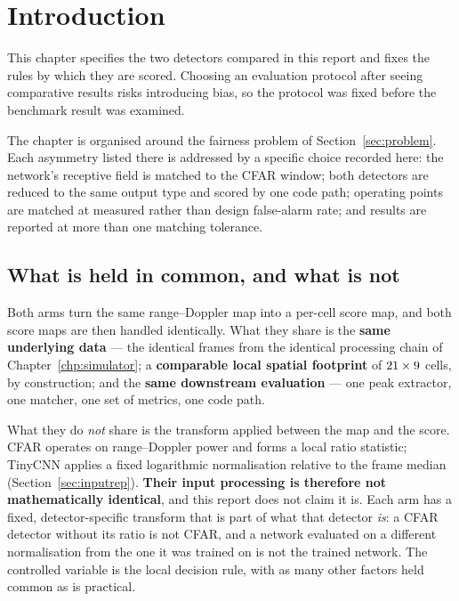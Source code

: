 
\section{Introduction}

This chapter specifies the two detectors compared in this report and fixes the rules by which they
are scored. Choosing an evaluation protocol after seeing comparative results risks introducing bias,
so the protocol was fixed before the benchmark result was examined.

The chapter is organised around the fairness problem of Section~\ref{sec:problem}. Each asymmetry
listed there is addressed by a specific choice recorded here: the network's receptive field is
matched to the CFAR window; both detectors are reduced to the same output type and scored by one
code path; operating points are matched at measured rather than design false-alarm rate; and results
are reported at more than one matching tolerance.

\subsection*{What is held in common, and what is not}
\label{sec:whatiscommon}

Both arms turn the same range--Doppler map into a per-cell score map, and both score maps are then
handled identically. What they share is the \textbf{same underlying data} --- the identical frames
from the identical processing chain of Chapter~\ref{chp:simulator}; a \textbf{comparable local
spatial footprint} of $21 \times 9$ cells, by construction; and the \textbf{same
downstream evaluation} --- one peak extractor, one matcher, one set of metrics, one code path.

What they do \emph{not} share is the transform applied between the map and the score. CFAR operates
on range--Doppler power and forms a local ratio statistic; TinyCNN applies a fixed logarithmic
normalisation relative to the frame median (Section~\ref{sec:inputrep}). \textbf{Their input
processing is therefore not mathematically identical}, and this report does not claim it is. Each arm
has a fixed, detector-specific transform that is part of what that detector \emph{is}: a CFAR
detector without its ratio is not CFAR, and a network evaluated on a different normalisation from the
one it was trained on is not the trained network. The controlled variable is the local decision rule,
with as many other factors held common as is practical.

